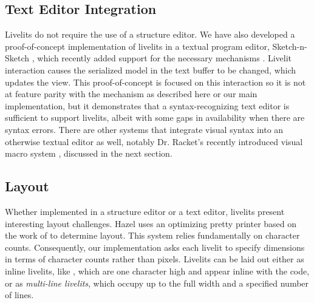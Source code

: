 \subsection{Text Editor Integration}
Livelits do not require the use of a structure editor. 
We have also developed a 
proof-of-concept implementation of livelits in a textual program editor, Sketch-n-Sketch \cite{sns-pldi,sns-uist},
which recently added support for the necessary mechanisms \cite{DBLP:journals/pacmpl/LubinCOC20}.
Livelit interaction causes the serialized model in the text buffer to be changed, which updates the view.
This proof-of-concept is focused on this interaction so it is not at feature parity with the 
mechanism as described here or 
our main implementation, but it demonstrates that a syntax-recognizing text editor \cite{DBLP:journals/tosem/BallanceGV92,DBLP:conf/sde/HorganM84,interactive-visual-syntax} 
is sufficient to support livelits, albeit with some gaps in availability when 
there are syntax errors.
There are other systems that integrate visual syntax into an otherwise textual editor as well, notably Dr. Racket's recently introduced visual macro system \cite{interactive-visual-syntax}, discussed in the next section.

\subsection{Layout}\label{sec:layout}
Whether implemented in a structure editor or a text editor, livelits present 
interesting layout challenges. 
Hazel uses an optimizing pretty printer based on the work of \citet{DBLP:journals/pacmpl/Bernardy17} to determine layout. This system relies 
fundamentally on character counts. Consequently, our implementation asks each 
livelit to specify dimensions in terms of character counts rather than pixels.
Livelits can be laid out either as inline livelits, like ,
which are one character high and appear inline with the code,
or as \emph{multi-line livelits}, which occupy up to the full width 
and a specified number of lines. %


